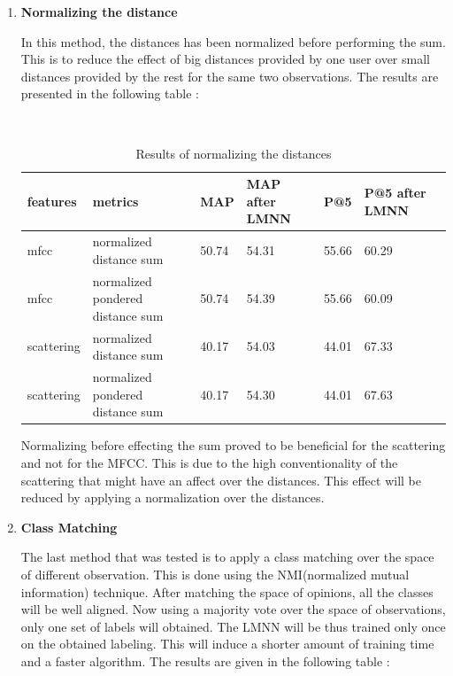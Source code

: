 \documentclass[hidelinks,12pt]{report}
\begin{document}
\begin{enumerate}
\item \textbf{Normalizing the distance}\par 
In this method, the distances has been normalized before performing the sum. This is to reduce the effect of big distances provided by one user over small distances provided by the rest for the same two observations. The results are presented in the following table :
\begin{table} [H]
\begin{center} 
\ 
 \setlength{\tabcolsep}{.16667em} 
\begin{tabular}{ | l | l | l | l | l | l | l |}
\hline
features & metrics & MAP & MAP after LMNN & P@5 & P@5 after LMNN  \\ 
\hline 
mfcc & normalized distance sum & 50.74 & 54.31 & 55.66 & 60.29  \\ 
mfcc & normalized pondered distance sum &50.74 & 54.39 & 55.66 & 60.09  \\ 
scattering & normalized distance sum & 40.17 & 54.03 & 44.01 & 67.33  \\ 
scattering & normalized pondered distance sum  & 40.17 & 54.30 & 44.01 & 67.63 \\ 
\hline
\end{tabular} 
\end{center} 
\caption{Results of normalizing the distances} 
\label{you} 
\end{table}  
 Normalizing before effecting the sum proved to be beneficial for the scattering and not for the MFCC. This is due to the high conventionality of the scattering that might have an affect over the distances. This effect will be reduced by applying a normalization over the distances.
 \item \textbf{Class Matching} \par 
 The last method that was tested is to apply a class matching over the space of different observation. This is done using the NMI(normalized mutual information) technique. After matching the space of opinions, all the classes will be well aligned. Now using a majority vote over the space of observations, only one set of labels will obtained. The LMNN will be thus trained only once on the obtained labeling. This will induce a shorter amount of training time and a faster algorithm. The results are given in the following table : 
 \begin{table}[H] 
\begin{center} 
\ 
 \setlength{\tabcolsep}{.16667em} 
\begin{tabular}{ | l | l | l | l | l | l |}

\end{tabular}
\end{center}
\end{table}
\end{enumerate}
\end{document}
